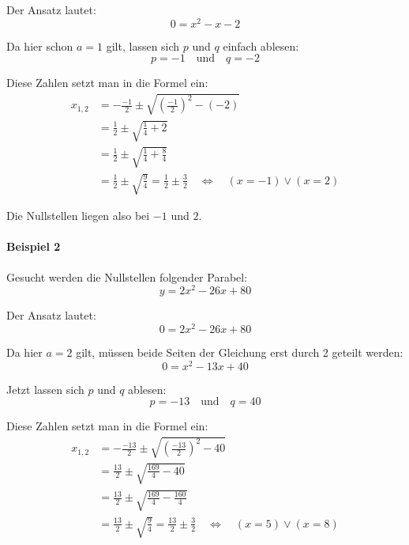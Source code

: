 \documentclass
[
  draft    = true,
  fontsize = 11pt,
  parskip  = half-,
  BCOR     = 0pt,
  DIV      = calc
]
{scrartcl}
\begin{document}
Der Ansatz lautet:
\begin{equation*}
  0=x^{2}-x-2
\end{equation*}

Da hier schon $a=1$ gilt, lassen sich $p$ und $q$ einfach ablesen:
\begin{equation*}
    p=-1\quad\text{und}\quad q=-2
\end{equation*}

Diese Zahlen setzt man in die Formel ein:
\begin{equation*}
  \begin{split}
    x_{1,2}&=-\frac{-1}{2}\pm\sqrt{\left(\frac{-1}{2}\right)^{2}-(-2)} \\[1ex]
           &=\frac{1}{2}\pm\sqrt{\frac{1}{4}+2} \\[1ex]
           &=\frac{1}{2}\pm\sqrt{\frac{1}{4}+\frac{8}{4}} \\[1ex]
           &=\frac{1}{2}\pm\sqrt{\frac{9}{4}}
            =\frac{1}{2}\pm\frac{3}{2}
             \quad\Leftrightarrow\quad (x=-1)\vee(x=2)
  \end{split}
\end{equation*}

Die Nullstellen liegen also bei $-1$ und $2$.

\paragraph{Beispiel 2}
Gesucht werden die Nullstellen folgender Parabel:
\begin{equation*}
  y=2x^{2}-26x+80
\end{equation*}

Der Ansatz lautet:
\begin{equation*}
  0=2x^{2}-26x+80
\end{equation*}

Da hier $a=2$ gilt, müssen beide Seiten der Gleichung erst durch 2 geteilt werden:
\begin{equation*}
  0=x^{2}-13x+40
\end{equation*}

Jetzt lassen sich $p$ und $q$ ablesen:
\begin{equation*}
    p=-13\quad\text{und}\quad q=40
\end{equation*}

Diese Zahlen setzt man in die Formel ein:
\begin{equation*}
  \begin{split}
    x_{1,2}&=-\frac{-13}{2}\pm\sqrt{\left(\frac{-13}{2}\right)^{2}-40} \\[1ex]
           &=\frac{13}{2}\pm\sqrt{\frac{169}{4}-40} \\[1ex]
           &=\frac{13}{2}\pm\sqrt{\frac{169}{4}-\frac{160}{4}} \\[1ex]
           &=\frac{13}{2}\pm\sqrt{\frac{9}{4}}
            =\frac{13}{2}\pm\frac{3}{2}
             \quad\Leftrightarrow\quad (x=5)\vee(x=8)
  \end{split}
\end{equation*}
\end{document}
